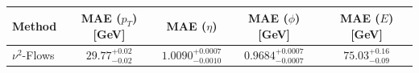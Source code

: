    \begin{tabular}{lcccc}
        \toprule
        Method & MAE ($p_T$) [GeV] & MAE ($\eta$) & MAE ($\phi$) [GeV] & MAE ($E$) [GeV] \\
        \midrule
        $\nu^2$-Flows & $29.77^{+0.02}_{-0.02}$ & $1.0090^{+0.0007}_{-0.0010}$ & $0.9684^{+0.0007}_{-0.0007}$ & $75.03^{+0.16}_{-0.09}$ \\
        \bottomrule
    \end{tabular}